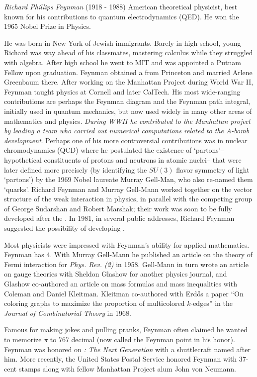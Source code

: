 \documentclass[12pt]{article}
\begin{document}

{\em Richard Phillips Feynman} (1918 - 1988) American theoretical physicist, best known for his contributions to quantum electrodynamics (QED). He won the 1965 Nobel Prize in Physics.

He was born in New York of Jewish immigrants. Barely in high school, young Richard was way ahead of his classmates, mastering calculus while they struggled with algebra. After high school he went to MIT and was appointed a Putnam Fellow upon graduation. Feynman obtained a  from Princeton and married Arlene Greenbaum there. After working on the Manhattan Project during World War II, Feynman taught physics at Cornell and later CalTech. His most wide-ranging contributions are perhaps the Feynman diagram and the Feynman path integral, initially used in quantum mechanics, but now used widely in many other areas of mathematics and physics. {\em During WWII he contributed
to the Manhattan project by leading a team who carried out numerical computations related to the A-bomb development}.
Perhaps one of his more controversial contributions was in nuclear chromodynamics (QCD) where he postulated the existence of `partons'--hypothetical constituents of protons and neutrons in atomic nuclei-- that were later defined more precisely (by identifying the $SU(3)$ flavor symmetry of light `partons') by the 1969 Nobel laureate Murray Gell-Man, who also re-named them `quarks'. Richard Feynman and Murray Gell-Mann worked together on the vector structure of the weak interaction in physics, in parallel with the competing group of George Sudarshan and Robert Marshak; their work was soon to be fully developed after the .
In 1981, in several public addresses, Richard Feynman suggested the possibility of developing 
.

Most physicists were impressed with Feynman's ability for applied mathematics. Feynman has  4. With Murray Gell-Mann he published an article on the theory of Fermi interaction for {\it Phys. Rev. (2)} in 1958. Gell-Mann in turn wrote an article on gauge theories with Sheldon Glashow for another physics journal, and Glashow co-authored an article on mass formulas and mass inequalities with Coleman and Daniel Kleitman. Kleitman co-authored with Erd\H{o}s a paper ``On coloring graphs to maximize the proportion of multicolored $k$-edges'' in the {\it Journal of Combinatorial Theory} in 1968.

Famous for making jokes and pulling pranks, Feynman often claimed he wanted to memorize $\pi$ to 767 decimal  (now called the Feynman point in his honor). Feynman was honored on {\it {}: The Next Generation} with a shuttlecraft named after him. More recently, the United States Postal Service honored Feynman with 37-cent stamps along with fellow Manhattan Project alum John von Neumann.

\end{document}
